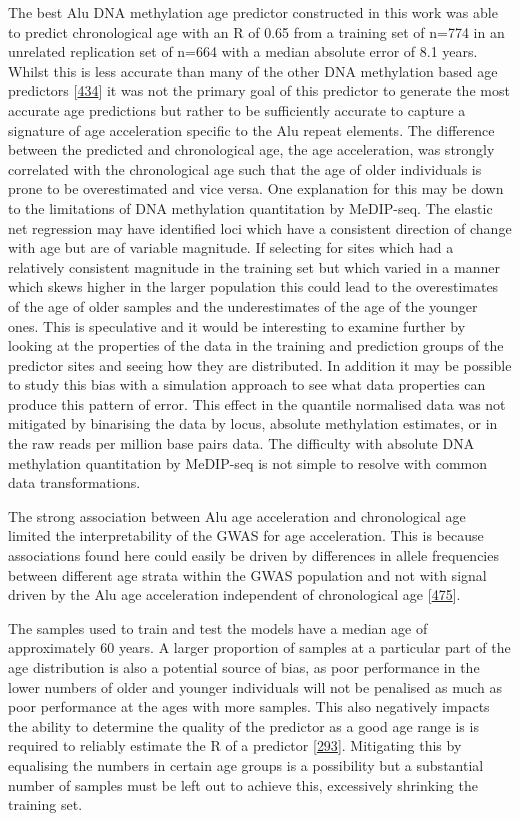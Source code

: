 \documentclass[
]{book}
\begin{document}
The best Alu DNA methylation age predictor constructed in this work was able to predict chronological age with an R of 0.65 from a training set of n=774 in an unrelated replication set of n=664 with a median absolute error of 8.1 years.
Whilst this is less accurate than many of the other DNA methylation based age predictors {[}\protect\hyperlink{ref-Bell2019}{434}{]} it was not the primary goal of this predictor to generate the most accurate age predictions but rather to be sufficiently accurate to capture a signature of age acceleration specific to the Alu repeat elements.
The difference between the predicted and chronological age, the age acceleration, was strongly correlated with the chronological age such that the age of older individuals is prone to be overestimated and vice versa.
One explanation for this may be down to the limitations of DNA methylation quantitation by MeDIP-seq.
The elastic net regression may have identified loci which have a consistent direction of change with age but are of variable magnitude.
If selecting for sites which had a relatively consistent magnitude in the training set but which varied in a manner which skews higher in the larger population this could lead to the overestimates of the age of older samples and the underestimates of the age of the younger ones.
This is speculative and it would be interesting to examine further by looking at the properties of the data in the training and prediction groups of the predictor sites and seeing how they are distributed.
In addition it may be possible to study this bias with a simulation approach to see what data properties can produce this pattern of error.
This effect in the quantile normalised data was not mitigated by binarising the data by locus, absolute methylation estimates, or in the raw reads per million base pairs data.
The difficulty with absolute DNA methylation quantitation by MeDIP-seq is not simple to resolve with common data transformations.

The strong association between Alu age acceleration and chronological age limited the interpretability of the GWAS for age acceleration.
This is because associations found here could easily be driven by differences in allele frequencies between different age strata within the GWAS population and not with signal driven by the Alu age acceleration independent of chronological age {[}\protect\hyperlink{ref-Price2010}{475}{]}.

The samples used to train and test the models have a median age of approximately 60 years.
A larger proportion of samples at a particular part of the age distribution is also a potential source of bias, as poor performance in the lower numbers of older and younger individuals will not be penalised as much as poor performance at the ages with more samples.
This also negatively impacts the ability to determine the quality of the predictor as a good age range is is required to reliably estimate the R of a predictor {[}\protect\hyperlink{ref-Horvath2018}{293}{]}.
Mitigating this by equalising the numbers in certain age groups is a possibility but a substantial number of samples must be left out to achieve this, excessively shrinking the training set.
\end{document}
